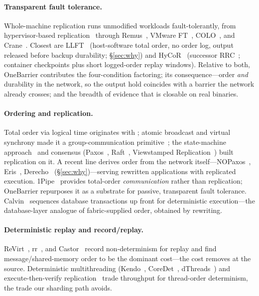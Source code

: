 \paragraph{Transparent fault tolerance.} Whole-machine replication runs
unmodified workloads fault-tolerantly, from hypervisor-based
replication~\citep{bressoud1995hypervisor} through Remus~\citep{cully2008remus},
VMware FT~\citep{scales2010vmwareft}, COLO~\citep{dong2013colo}, and
Crane~\citep{cui2015crane}. Closest are LLFT~\citep{zhao2013llft}
(host-software total order, no order log, output released before backup
durability; \S\ref{sec:why}) and HyCoR~\citep{zhou2021hycor} (successor
RRC~\citep{zhou2022rrc}; container checkpoints plus short logged-order
replay windows). Relative to both, OneBarrier contributes the
four-condition factoring; its consequence---order \emph{and} durability in
the network, so the output hold coincides with a barrier the network
already crosses; and the breadth of evidence that \Determinism is closable
on real binaries.

\paragraph{Ordering and replication.} Total order via logical time
originates with \citet{lamport1978time}; atomic broadcast and virtual
synchrony made it a group-communication
primitive~\citep{birman1987isis,defago2004total}; the state-machine
approach~\citep{schneider1990smr} and consensus
(Paxos~\citep{lamport1998parttime}, Raft~\citep{ongaro2014raft},
Viewstamped Replication~\citep{oki1988vr}) built replication on it. A
recent line derives order from the network itself---NOPaxos~\citep{li2016nopaxos},
Eris~\citep{li2017eris}, Derecho~\citep{jha2019derecho}
(\S\ref{sec:why})---serving rewritten applications with
replicated execution. 1Pipe~\citep{li2021onepipe} provides
total-order \emph{communication} rather than replication; OneBarrier
repurposes it as a substrate for passive, transparent fault tolerance.
Calvin~\citep{thomson2012calvin} sequences database transactions up front
for deterministic execution---the database-layer analogue of
fabric-supplied order, obtained by rewriting.

\paragraph{Deterministic replay and record/replay.}
ReVirt~\citep{dunlap2002revirt}, rr~\citep{ocallahan2017rr}, and
Castor~\citep{mashtizadeh2017castor} record non-determinism for replay and
find message/shared-memory order to be the dominant cost---the cost
\Order removes at the source. Deterministic multithreading
(Kendo~\citep{olszewski2009kendo}, CoreDet~\citep{bergan2010coredet},
dThreads~\citep{liu2011dthreads}) and execute-then-verify
replication~\citep{kapritsos2012eve,guo2014rex} trade throughput for
thread-order determinism, the trade our sharding path avoids.

